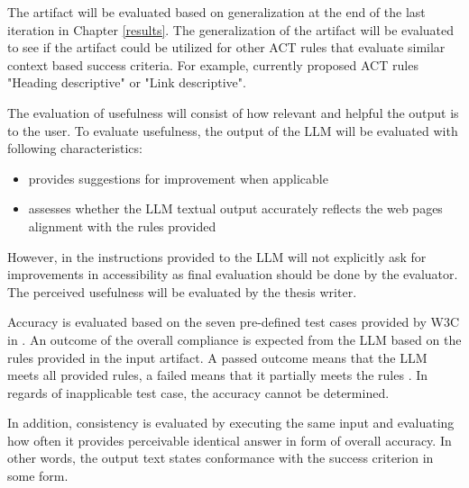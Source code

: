 The artifact will be evaluated based on generalization at the end of the last iteration in Chapter \ref{results}. The generalization of the artifact will be evaluated to see if the artifact could be utilized for other ACT rules that evaluate similar context based success criteria. For example, currently proposed ACT rules "Heading descriptive" or "Link descriptive".

The evaluation of usefulness will consist of how relevant and helpful the output is to the user. To evaluate usefulness, the output of the LLM will be evaluated with following characteristics: 

\begin{itemize}
    \item provides suggestions for improvement when applicable
    \item assesses whether the LLM textual output accurately reflects the web pages alignment with the rules provided
\end{itemize}

However, in the instructions provided to the LLM will not explicitly ask for improvements in accessibility as final evaluation should be done by the evaluator. The perceived usefulness will be evaluated by the thesis writer.

Accuracy is evaluated based on the seven pre-defined test cases provided by W3C in \textcite{act_rule_g88}. An outcome of the overall compliance is expected from the LLM based on the rules provided in the input artifact. A passed outcome means that the LLM meets all provided rules, a failed means that it partially meets the rules \citep{act_rule_g88}. In regards of inapplicable test case, the accuracy cannot be determined. 

In addition, consistency is evaluated by executing the same input and evaluating how often it provides perceivable identical answer in form of overall accuracy. In other words, the output text states conformance with the success criterion in some form. 

